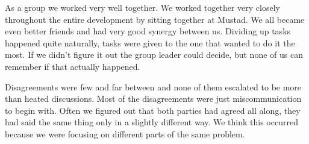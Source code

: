 As a group we worked very well together. We worked together very closely
throughout the entire development by sitting together at Mustad. We all became
even better friends and had very good synergy between us. Dividing up tasks
happened quite naturally, tasks were given to the one that wanted to do it the
most. If we didn’t figure it out the group leader could decide, but none of us
can remember if that actually happened.

Disagreements were few and far between and none of them escalated to be more
than heated discussions. Most of the disagreements were just miscommunication
to begin with. Often we figured out that both parties had agreed all along,
they had said the same thing only in a slightly different way. We think this
occurred because we were focusing on different parts of the same problem.